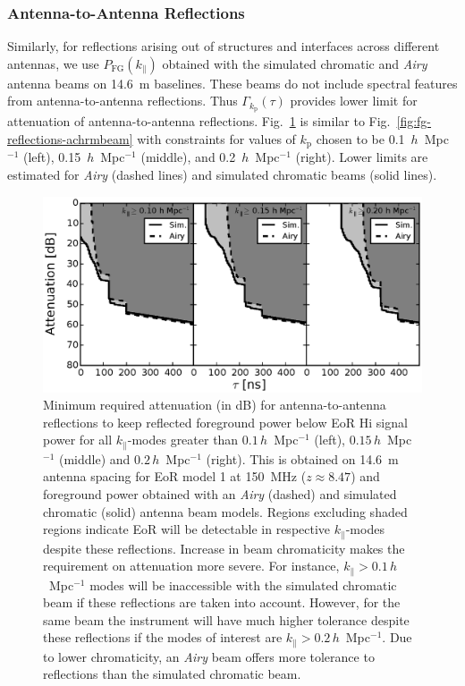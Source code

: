 \documentclass[preprint2,iop,numberedappendix,twocolappendix,appendixfloats]{emulateapj}
\begin{document}
\subsubsection{Antenna-to-Antenna Reflections}\label{sec:antenna-antenna-reflections}

Similarly, for reflections arising out of structures and interfaces across different antennas, we use $P_\textrm{FG}(k_\parallel)$ obtained with the simulated chromatic and {\it Airy} antenna beams on 14.6~m baselines. These beams do not include spectral features from antenna-to-antenna reflections. Thus $\Gamma_{k_\textrm{p}}(\tau)$ provides lower limit for attenuation of antenna-to-antenna reflections. Fig.~\ref{fig:fg-reflections} is similar to Fig.~\ref{fig:fg-reflections-achrmbeam} with constraints for values of $k_\textrm{p}$ chosen to be 0.1~$h$~Mpc$^{-1}$ (left), 0.15~$h$~Mpc$^{-1}$ (middle), and 0.2~$h$~Mpc$^{-1}$ (right). Lower limits are estimated for {\it Airy} (dashed lines) and simulated chromatic beams (solid lines).

\begin{figure}[htb]
\centering
\includegraphics[width=\linewidth]{spec_on_foreground_reflected_power_21cmfast_14.6m_150.0_MHz_subband_v2.eps}
\caption{Minimum required attenuation (in dB) for antenna-to-antenna reflections to keep reflected foreground power below EoR H{\sc i} signal power for all $k_\parallel$-modes greater than $0.1\,h$~Mpc$^{-1}$ (left), $0.15\,h$~Mpc$^{-1}$ (middle) and $0.2\,h$~Mpc$^{-1}$ (right). This is obtained on 14.6~m antenna spacing for EoR model 1 at 150~MHz ($z\approx 8.47$) and foreground power obtained with an {\it Airy} (dashed) and simulated chromatic (solid) antenna beam models. Regions excluding shaded regions indicate EoR will be detectable in respective $k_\parallel$-modes despite these reflections. Increase in beam chromaticity makes the requirement on attenuation more severe. For instance, $k_\parallel > 0.1\,h$~Mpc$^{-1}$ modes will be inaccessible with the simulated chromatic beam if these reflections are taken into account. However, for the same beam the instrument will have much higher tolerance despite these reflections if the modes of interest are $k_\parallel > 0.2\,h$~Mpc$^{-1}$. Due to lower chromaticity, an {\it Airy} beam offers more tolerance to reflections than the simulated chromatic beam.}
\label{fig:fg-reflections}
\end{figure}
\end{document}
